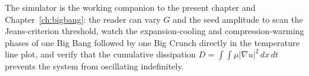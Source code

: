 The simulator is the working companion to the present chapter and
Chapter~\ref{ch:bigbang}: the reader can vary $G$ and the seed amplitude
to scan the Jeans-criterion threshold, watch the
expansion-cooling and compression-warming phases of one Big Bang
followed by one Big Crunch directly in the temperature line plot, and
verify that the cumulative dissipation $D = \int\!\int\mu|\nabla u|^2\,dx\,dt$
prevents the system from oscillating indefinitely.



